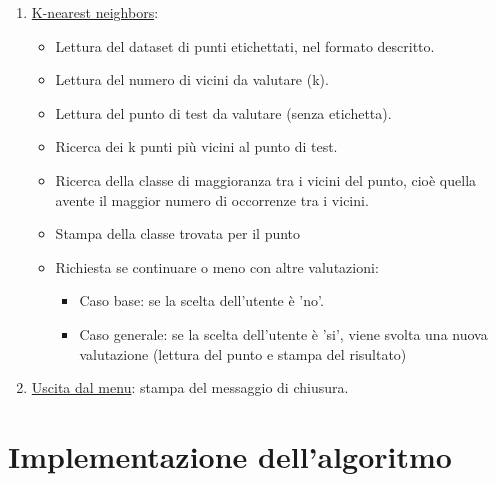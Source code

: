\documentclass[11pt]{article}
\theoremstyle{definition}
\begin{document}
\begin{itemize}
\begin{itemize}
\begin{enumerate}
     \item \underline{K-nearest neighbors}: 
       \begin{itemize}
         \item Lettura del dataset di punti etichettati, nel formato descritto.
         \item Lettura del numero di vicini da valutare (k).
         \item Lettura del punto di test da valutare (senza etichetta).
         \item Ricerca dei k punti più vicini al punto di test.
         \item Ricerca della classe di maggioranza tra i vicini del punto, cioè quella avente il maggior numero di occorrenze tra i vicini.
         \item Stampa della classe trovata per il punto
         \item Richiesta se continuare o meno con altre valutazioni:
            \begin{itemize}
            \item Caso base: se la scelta dell'utente è 'no'.
            \item Caso generale: se la scelta dell'utente è 'si', viene svolta una nuova valutazione (lettura del punto e stampa del risultato)
            \end{itemize}
       \end{itemize}
      \item \underline{Uscita dal menu}: stampa del messaggio di chiusura.
		\end{enumerate}
	\end{itemize}
\end{itemize}

\newpage

\section{Implementazione dell'algoritmo}

\newpage
\end{document}
